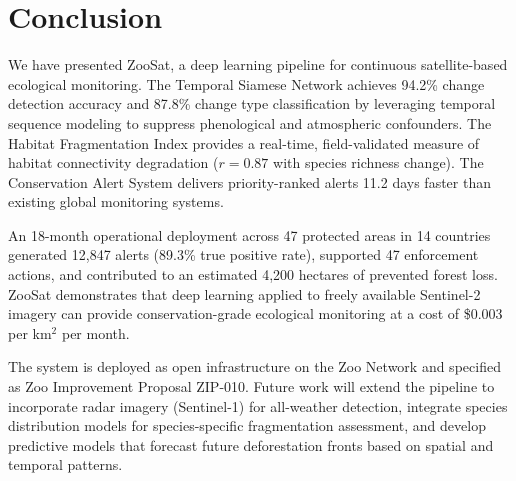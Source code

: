 \section{Conclusion}

\label{sec:conclusion}

We have presented ZooSat, a deep learning pipeline for continuous satellite-based ecological monitoring.
The Temporal Siamese Network achieves 94.2\% change detection accuracy and 87.8\% change type classification by leveraging temporal sequence modeling to suppress phenological and atmospheric confounders.
The Habitat Fragmentation Index provides a real-time, field-validated measure of habitat connectivity degradation ($r = 0.87$ with species richness change).
The Conservation Alert System delivers priority-ranked alerts 11.2 days faster than existing global monitoring systems.

An 18-month operational deployment across 47 protected areas in 14 countries generated 12,847 alerts (89.3\% true positive rate), supported 47 enforcement actions, and contributed to an estimated 4,200 hectares of prevented forest loss.
ZooSat demonstrates that deep learning applied to freely available Sentinel-2 imagery can provide conservation-grade ecological monitoring at a cost of \$0.003 per km$^2$ per month.

The system is deployed as open infrastructure on the Zoo Network and specified as Zoo Improvement Proposal ZIP-010.
Future work will extend the pipeline to incorporate radar imagery (Sentinel-1) for all-weather detection, integrate species distribution models for species-specific fragmentation assessment, and develop predictive models that forecast future deforestation fronts based on spatial and temporal patterns.

